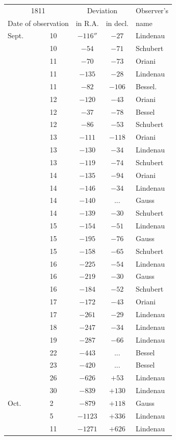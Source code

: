 \begin{center}

\fontsize{10}{12}\selectfont\setlength{\tabcolsep}{7pt}\renewcommand{\arraystretch}{1.05}\begin{tabular}{ll|c|c|l}
\multicolumn{2}{c|}{1811} & \multicolumn{2}{c|}{Deviation} & Observer’s \\
\multicolumn{2}{c|}{Date of observation} & in R.A. & in decl. & name \\\hline
Sept. & 10 & $-116''$ & $-27$ & Lindenau \\
 & 10 & $-54$ & $-71$ & Schubert \\
 & 11 & $-70$ & $-73$ & Oriani \\
 & 11 & $-135$ & $-28$ & Lindenau \\
 & 11 & $-82$ & $-106$ & Bessel. \\
 & 12 & $-120$ & $-43$ & Oriani \\
 & 12 & $-37$ & $-78$ & Bessel \\
 & 12 & $-86$ & $-53$ & Schubert \\
 & 13 & $-111$ & $-118$ & Oriani \\
 & 13 & $-130$ & $-34$ & Lindenau \\
 & 13 & $-119$ & $-74$ & Schubert \\
 & 14 & $-135$ & $-94$ & Oriani \\
 & 14 & $-146$ & $-34$ & Lindenau \\
 & 14 & $-140$ & .\;.\;. & Gauss \\
 & 14 & $-139$ & $-30$ & Schubert \\
 & 15 & $-154$ & $-51$ & Lindenau \\
 & 15 & $-195$ & $-76$ & Gauss \\
 & 15 & $-158$ & $-65$ & Schubert \\
 & 16 & $-225$ & $-54$ & Lindenau \\
 & 16 & $-219$ & $-30$ & Gauss \\
 & 16 & $-184$ & $-52$ & Schubert \\
 & 17 & $-172$ & $-43$ & Oriani \\
 & 17 & $-261$ & $-29$ & Lindenau \\
 & 18 & $-247$ & $-34$ & Lindenau \\
 & 19 & $-287$ & $-66$ & Lindenau \\
 & 22 & $-443$ & .\;.\;. & Bessel \\
 & 23 & $-420$ & .\;.\;. & Bessel \\
 & 26 & $-626$ & $+53$ & Lindenau \\
 & 30 & $-839$ & $+130$ & Lindenau \\
Oct. & 2 & $-879$ & $+118$ & Gauss \\
 & 5 & $-1123$ & $+336$ & Lindenau \\
 & 11 & $-1271$ & $+626$ & Lindenau \\
\end{tabular}

\end{center}

